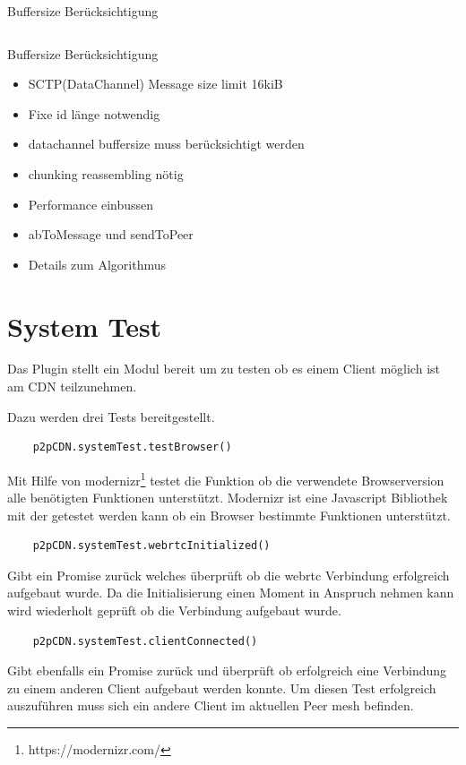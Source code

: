 \begin{listing}[h]
	\inputminted{javascript}{listings/buffersize.js}
	\caption{Buffersize Berücksichtigung}
	\label{lst:code-buffersize}
\end{listing}
\begin{listing}[h]
	\inputminted{javascript}{listings/handle_chunk.js}
	\caption{Buffersize Berücksichtigung}
	\label{lst:code-handle-chunk}
\end{listing}

\begin{itemize}
  \item SCTP(DataChannel) Message size limit 16kiB
  \item Fixe id länge notwendig
  \item datachannel buffersize muss berücksichtigt werden
  \item chunking reassembling nötig
  \item Performance einbussen
  \item abToMessage und sendToPeer
\end{itemize}



\begin{itemize}
	\item Details zum Algorithmus
\end{itemize}
\section{System Test}
Das Plugin stellt ein Modul bereit um zu testen ob es einem Client möglich ist am \pTp CDN teilzunehmen.

Dazu werden drei Tests bereitgestellt.
\begin{lstlisting}
	p2pCDN.systemTest.testBrowser()
\end{lstlisting}
 Mit Hilfe von modernizr\footnote{https://modernizr.com/} testet die Funktion ob die verwendete Browserversion alle benötigten Funktionen unterstützt. Modernizr ist eine Javascript Bibliothek mit der getestet werden kann ob ein Browser bestimmte Funktionen unterstützt.
\begin{lstlisting}
	p2pCDN.systemTest.webrtcInitialized()
\end{lstlisting}
Gibt ein Promise zurück welches überprüft ob die webrtc Verbindung erfolgreich aufgebaut wurde. Da die Initialisierung einen Moment in Anspruch nehmen kann wird wiederholt geprüft ob die Verbindung aufgebaut wurde.
\begin{lstlisting}
	p2pCDN.systemTest.clientConnected()
\end{lstlisting}
Gibt ebenfalls ein Promise zurück und überprüft ob erfolgreich eine Verbindung zu einem anderen Client aufgebaut werden konnte. Um diesen Test erfolgreich auszuführen muss sich ein andere Client im aktuellen Peer mesh befinden.

